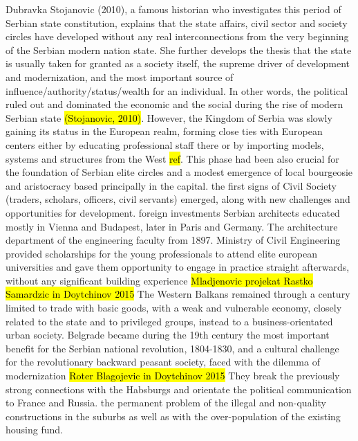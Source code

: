\documentclass[11pt]{report}
\begin{document}
Dubravka Stojanovic (2010), a famous historian who investigates this period of Serbian state constitution, explains that the state affairs, civil sector and society circles have developed without any real interconnections from the very beginning of the Serbian modern nation state. She further develops the thesis that the state is usually taken for granted as a society itself, the supreme driver of development and modernization, and the most important source of influence/authority/status/wealth for an individual. In other words, the political ruled out and dominated the economic and the social during the rise of modern Serbian state \hl{(Stojanovic, 2010)}.\footnotemark
However, the Kingdom of Serbia was slowly gaining its status in the European realm, forming close ties with European centers either by educating professional staff there or by importing models, systems and structures from the West \hl{ref}. This phase had been also crucial for the foundation of Serbian elite circles and a modest emergence of local bourgeosie and aristocracy based principally in the capital.
the  first  signs  of  Civil  Society (traders, scholars, officers, civil servants) emerged, along with new challenges and  opportunities  for  development.
foreign investments
Serbian architects educated mostly in Vienna and Budapest, later in Paris and Germany. The architecture department of the engineering faculty from 1897. 
Ministry of Civil Engineering provided scholarships for the young professionals to attend elite european universities and gave them opportunity to engage in practice straight afterwards, without any significant building experience \hl{Mladjenovic projekat Rastko}
	\hl{Samardzic in Doytchinov 2015} 
The Western Balkans remained through a century limited to trade with basic goods, with a weak and vulnerable economy, closely related to the state and to privileged groups, instead  to  a  business-orientated  urban  society.
Belgrade became during the 19th  century the most important benefit for the Serbian national revolution, 1804-1830, and a cultural challenge for the revolutionary backward peasant society, faced with the dilemma of modernization
	\hl{Roter Blagojevic in Doytchinov 2015}
They break the previously strong connections with the Habsburgs and orientate the political communication to France and Russia.
the permanent problem of the illegal and non-quality constructions in the suburbs as well as with the over-population of the existing housing fund. 
\end{document}
